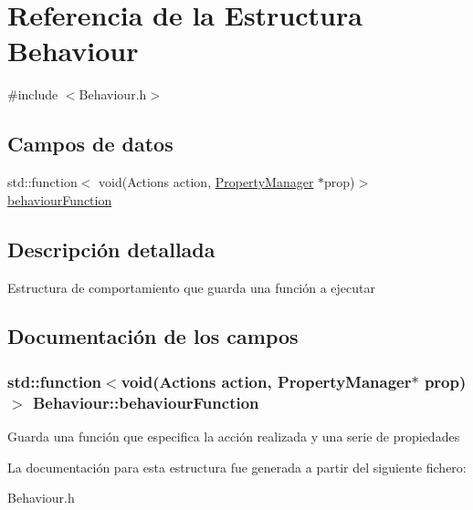\hypertarget{structBehaviour}{}\section{Referencia de la Estructura Behaviour}
\label{structBehaviour}


{\ttfamily \#include $<$Behaviour.\+h$>$}

\subsection*{Campos de datos}
\begin{DoxyCompactItemize}
\item 
std\+::function$<$ void(Actions action, \hyperlink{classPropertyManager}{Property\+Manager} $\ast$prop)$>$ \hyperlink{structBehaviour_a870609da80d44c4825b2de567e28dd24}{behaviour\+Function}
\end{DoxyCompactItemize}


\subsection{Descripción detallada}
Estructura de comportamiento que guarda una función a ejecutar 

\subsection{Documentación de los campos}
\hypertarget{structBehaviour_a870609da80d44c4825b2de567e28dd24}{}
\subsubsection[{behaviour\+Function}]{\setlength{\rightskip}{0pt plus 5cm}std\+::function$<$void(Actions action, {\bf Property\+Manager}$\ast$ prop)$>$ Behaviour\+::behaviour\+Function}\label{structBehaviour_a870609da80d44c4825b2de567e28dd24}
Guarda una función que especifica la acción realizada y una serie de propiedades 

La documentación para esta estructura fue generada a partir del siguiente fichero\+:\begin{DoxyCompactItemize}
\item 
Behaviour.\+h\end{DoxyCompactItemize}
